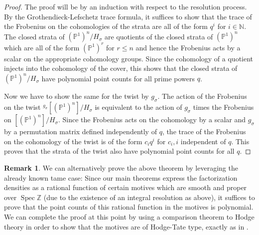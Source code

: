 \documentclass[10pt]{article}
\theoremstyle{plain}
\theoremstyle{definition}
\newtheorem{remark}[theorem]{Remark}
\numberwithin{equation}{section}
\begin{document}
\begin{proof}
    The proof will be by an induction with respect to the resolution process. By the Grothendieck-Lefschetz trace formula, it suffices to show that the trace of the Frobenius on the cohomologies of the strata are all of the form $q^i$ for $i \in \mathbb N$. The closed strata of $(\mathbb P^1)^n / H_\sigma$ are quotients of the closed strata of $(\mathbb P^1)^n$ which are all of the form $(\mathbb P^1)^r$ for $r \leq n$ and hence the Frobenius acts by a scalar on the appropriate cohomology groups. Since the cohomology of a quotient injects into the cohomology of the cover, this shows that the closed strata of $(\mathbb P^1)^n / H_\sigma$ have polynomial point counts for all prime powers $q$.

    Now we have to show the same for the twist by $g_{\sigma}$. The action of the Frobenius on the twist $^{g_\sigma}[(\mathbb P^1)^n] / H_\sigma$ is equivalent to the action of $g_\sigma$ times the Frobenius on $[(\mathbb P^1)^n] / H_\sigma$. Since the Frobenius acts on the cohomology by a scalar and $g_\sigma$ by a permutation matrix defined independently of $q$, the trace of the Frobenius on the cohomology of the twist is of the form $c_iq^i$ for $c_i,i$ independent of $q$. This proves that the strata of the twist also have polynomial point counts for all $q$.

\end{proof}

\begin{remark}
    We can alternatively prove the above theorem by leveraging the already known tame case: Since our main theorems express the factorization densities as a rational function of certain motives which are smooth and proper over $\operatorname{Spec}\mathbb Z$ (due to the existence of an integral resolution as above), it suffices to prove that the point counts of this rational function in the motives is polynomial. We can complete the proof at this point by using a comparison theorem to Hodge theory in order to show that the motives are of Hodge-Tate type, exactly as in \cite[\S Appendix]{hausel2008mixed}. 
\end{remark}



\end{document}
